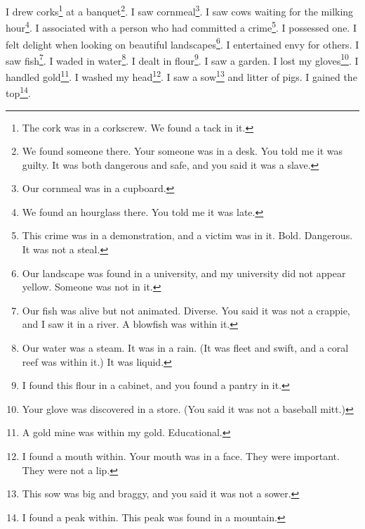 \documentclass[12pt]{book}
\begin{document}
 I drew corks\footnote{The cork was in a corkscrew. We found a tack in it.} at a banquet\footnote{We found someone there. Your someone was in a desk. You told me it was guilty. It was both dangerous and safe, and you said it was a slave.}. I saw cornmeal\footnote{Our cornmeal was in a cupboard.}. I saw cows waiting for the milking hour\footnote{We found an hourglass there. You told me it was late.}. I associated with a person who had committed a crime\footnote{This crime was in a demonstration, and a victim was in it. Bold. Dangerous. It was not a steal.}. I possessed one. I felt delight when looking on beautiful landscapes\footnote{Our landscape was found in a university, and my university did not appear yellow. Someone was not in it.}. I entertained envy for others. I saw fish\footnote{Our fish was alive but not animated. Diverse. You said it was not a crappie, and I saw it in a river. A blowfish was within it.}. I waded in water\footnote{Our water was a steam. It was in a rain. (It was fleet and swift, and a coral reef was within it.) It was liquid.}. I dealt in flour\footnote{I found this flour in a cabinet, and you found a pantry in it.}. I saw a garden. I lost my gloves\footnote{Your glove was discovered in a store. (You said it was not a baseball mitt.)}. I handled gold\footnote{A gold mine was within my gold. Educational.}. I washed my head\footnote{I found a mouth within. Your mouth was in a face. They were important. They were not a lip.}. I saw a sow\footnote{This sow was big and braggy, and you said it was not a sower.} and litter of pigs. I gained the top\footnote{I found a peak within. This peak was found in a mountain.}. 
\end{document}
